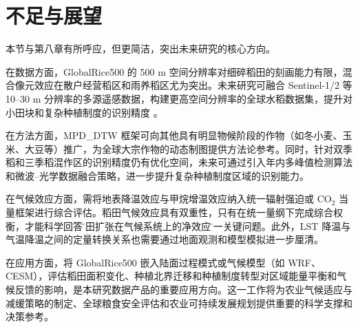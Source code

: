 \section{不足与展望}

本节与第八章有所呼应，但更简洁，突出未来研究的核心方向。

在数据方面，GlobalRice500 的 500 m 空间分辨率对细碎稻田的刻画能力有限，混合像元效应在散户经营稻区和雨养稻区尤为突出。未来研究可融合 Sentinel-1/2 等 10--30 m 分辨率的多源遥感数据，构建更高空间分辨率的全球水稻数据集，提升对小田块和复杂种植制度的识别精度 \cite{Zhan2021, Han2021}。

在方法方面，MPD\_DTW 框架可向其他具有明显物候阶段的作物（如冬小麦、玉米、大豆等）推广，为全球大宗作物的动态制图提供方法论参考。同时，针对双季稻和三季稻混作区的识别精度仍有优化空间，未来可通过引入年内多峰值检测算法和微波--光学数据融合策略，进一步提升复杂种植制度区域的识别能力。

在气候效应方面，需将地表降温效应与甲烷增温效应纳入统一辐射强迫或 CO$_2$ 当量框架进行综合评估。稻田气候效应具有双重性，只有在统一量纲下完成综合权衡，才能科学回答\"稻田扩张在气候系统上的净效应\"这一关键问题。此外，LST 降温与气温降温之间的定量转换关系也需要通过地面观测和模型模拟进一步厘清。

在应用方面，将 GlobalRice500 嵌入陆面过程模式或气候模型（如 WRF、CESM），评估稻田面积变化、种植北界迁移和种植制度转型对区域能量平衡和气候反馈的影响，是本研究数据产品的重要应用方向。这一工作将为农业气候适应与减缓策略的制定、全球粮食安全评估和农业可持续发展规划提供重要的科学支撑和决策参考。
